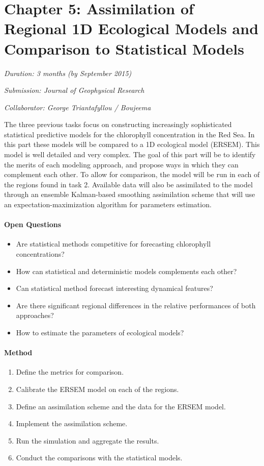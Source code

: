 \section{Chapter 5: Assimilation of Regional 1D Ecological Models and Comparison to Statistical Models}

\noindent
\emph{Duration: 3 months (by September 2015)}

\noindent
\emph{Submission: Journal of Geophysical Research}

\noindent
\emph{Collaborator: George Triantafyllou / Boujeema}

The three previous tasks focus on constructing increasingly sophisticated statistical predictive models for the chlorophyll concentration in the Red Sea. In this part these models will be compared to a 1D ecological model (ERSEM). This model is well detailed and very complex. The goal of this part will be to identify the merits of each modeling approach, and propose ways in which they can complement each other. To allow for comparison, the model will be run in each of the regions found in task 2. Available data will also be assimilated to the model through an ensemble Kalman-based smoothing assimilation scheme that will use an expectation-maximization algorithm for parameters estimation. 

\paragraph{Open Questions}

\begin{itemize}
  \item Are statistical methods competitive for forecasting chlorophyll concentrations?
  \item How can statistical and deterministic models complements each other?
  \item Can statistical method forecast interesting dynamical features?
  \item Are there significant regional differences in the relative performances of both approaches?
  \item How to estimate the parameters of ecological models? 
\end{itemize}

\paragraph{Method}

\begin{enumerate}
  \item Define the metrics for comparison.
  \item Calibrate the ERSEM model on each of the regions.
  \item Define an assimilation scheme and the data for the ERSEM model.
  \item Implement the assimilation scheme.
  \item Run the simulation and aggregate the results.
  \item Conduct the comparisons with the statistical models.
\end{enumerate}

